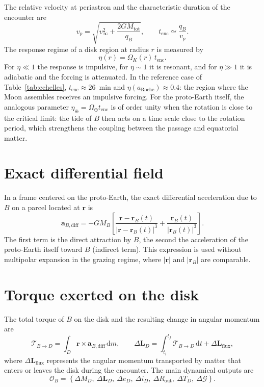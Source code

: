 \documentclass[11pt,a4paper,openany]{report}
\newcommand{\aR}{a_{\mathrm{Roche}}}
\newcommand{\dd}{\mathrm{d}}
\newcommand{\Mtot}{M_{\mathrm{tot}}}
\begin{document}
The relative velocity at periastron and the characteristic duration of the encounter are
\begin{equation}
v_p=\sqrt{v_\infty^2+\frac{2G\Mtot}{q_B}},
\qquad
t_{\mathrm{enc}}\simeq\frac{q_B}{v_p}.
\label{eq:tenc}
\end{equation}
The response regime of a disk region at radius $r$ is measured by
\begin{equation}
\eta(r)=\Omega_K(r)\,t_{\mathrm{enc}}.
\label{eq:eta}
\end{equation}
For $\eta\ll1$ the response is impulsive, for $\eta\sim1$ it is resonant, and for $\eta\gg1$ it is
adiabatic and the forcing is attenuated. In the reference case of Table~\ref{tab:echelles},
$t_{\mathrm{enc}}\approx26$~min and $\eta(\aR)\approx0.4$: the region where the Moon assembles
receives an impulsive forcing. For the proto-Earth itself, the analogous parameter
$\eta_\oplus=\Omega_\oplus t_{\mathrm{enc}}$ is of order unity when the rotation is close to the
critical limit: the tide of $B$ then acts on a time scale close to the rotation period, which
strengthens the coupling between the passage and equatorial matter.

\section{Exact differential field}

In a frame centered on the proto-Earth, the exact differential acceleration due to $B$ on a parcel
located at $\mathbf{r}$ is
\begin{equation}
\mathbf{a}_{B,\mathrm{diff}}=-GM_B\left[
\frac{\mathbf{r}-\mathbf{r}_B(t)}{|\mathbf{r}-\mathbf{r}_B(t)|^3}
+\frac{\mathbf{r}_B(t)}{|\mathbf{r}_B(t)|^3}\right].
\label{eq:adiff}
\end{equation}
The first term is the direct attraction by $B$, the second the acceleration of the proto-Earth
itself toward $B$ (indirect term). This expression is used without multipolar expansion in the
grazing regime, where $|\mathbf{r}|$ and $|\mathbf{r}_B|$ are comparable.

\section{Torque exerted on the disk}

The total torque of $B$ on the disk and the resulting change in angular momentum are
\begin{equation}
\boldsymbol{\mathcal{T}}_{B\to D}=\int_D\mathbf{r}\times\mathbf{a}_{B,\mathrm{diff}}\,\dd m,
\qquad
\Delta\mathbf{L}_D=\int_{t_i}^{t_f}\boldsymbol{\mathcal{T}}_{B\to D}\,\dd t+\Delta\mathbf{L}_{\mathrm{flux}},
\label{eq:couple}
\end{equation}
where $\Delta\mathbf{L}_{\mathrm{flux}}$ represents the angular momentum transported by matter that
enters or leaves the disk during the encounter. The main dynamical outputs are
\begin{equation}
\mathcal{O}_B=\left\{\Delta M_D,\ \Delta\mathbf{L}_D,\ \Delta e_D,\ \Delta i_D,\
\Delta R_{\mathrm{out}},\ \Delta T_D,\ \Delta\mathcal{G}\right\}.
\label{eq:OB}
\end{equation}
\end{document}
